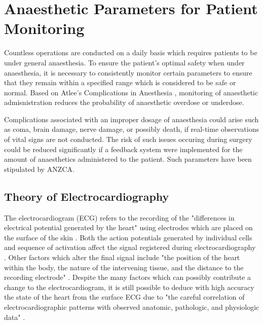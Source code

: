 \section{Anaesthetic Parameters for Patient Monitoring}

Countless operations are conducted on a daily basis which requires patients to be under general anaesthesia. To ensure the patient's optimal safety when under anaesthesia, it is necessary to consistently monitor certain parameters to ensure that they remain within a specified range which is considered to be safe or normal. Based on Atlee's Complications in Anesthesia \cite{atlee2006complications}, monitoring of anaesthetic admisnistration reduces the probability of anaesthetic overdose or underdose. 

Complications associated with an improper dosage of anaesthesia could arise such as coma, brain damage, nerve damage, or possibly death, if real-time observations of vital signs are not conducted. The risk of such issues occuring during surgery could be reduced significantly if a feedback system were implemented for the amount of anaesthetics administered to the patient. Such parameters have been stipulated by ANZCA. 

\subsection{Theory of Electrocardiography}

The electrocardiogram (ECG) refers to the recording of the "differences in electrical potential generated by the heart" using electrodes which are placed on the surface of the skin \cite{noble1990electrocardiography}. Both the action potentials generated by individual cells and sequence of activation affect the signal registered during electrocardiography \cite{noble1990electrocardiography}. Other factors which alter the final signal include "the position of the heart within the body, the nature of the intervening tissue, and the distance to the recording electrode" \cite{noble1990electrocardiography}. Despite the many factors which can possibly contribute a change to the electrocardiogram, it is still possible to deduce with high accuracy the state of the heart from the surface ECG due to "the careful correlation of electrocardiographic patterns with observed anatomic, pathologic, and physiologic data" \cite{noble1990electrocardiography}. 


